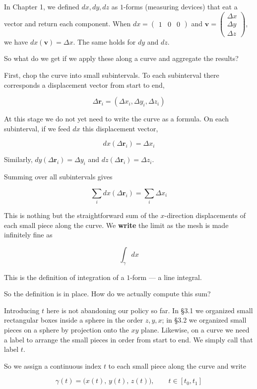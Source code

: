 In Chapter 1, we defined \(dx, dy, dz\) as \(1\)-forms (measuring
devices) that eat a vector and return each component. When
\(dx = \begin{pmatrix}1&0&0\end{pmatrix}\) and
\(\mathbf{v} = \begin{pmatrix}\Delta x\\\Delta y\\\Delta z\end{pmatrix}\),
we have \(dx(\mathbf{v}) = \Delta x\). The same holds for \(dy\) and
\(dz\).

So what do we get if we apply these along a curve and aggregate the
results?

First, chop the curve into small subintervals. To each subinterval there
corresponds a displacement vector from start to end,

\[
\Delta\mathbf{r}_i=(\Delta x_i,\Delta y_i,\Delta z_i)
\]

At this stage we do not yet need to write the curve as a formula. On
each subinterval, if we feed \(dx\) this displacement vector,

\[dx(\Delta\mathbf{r}_i)=\Delta x_i\]

Similarly, \(dy(\Delta\mathbf{r}_i)=\Delta y_i\) and
\(dz(\Delta\mathbf{r}_i)=\Delta z_i\).

Summing over all subintervals gives

\[
\sum_i dx(\Delta\mathbf{r}_i)=\sum_i \Delta x_i
\]

This is nothing but the straightforward sum of the \(x\)-direction
displacements of each small piece along the curve. We \textbf{write} the
limit as the mesh is made infinitely fine as

\[\int_\gamma dx\]

This is the definition of integration of a \(1\)-form --- a line
integral.

So the definition is in place. How do we actually compute this sum?

Introducing \(t\) here is not abandoning our policy so far. In §3.1 we
organized small rectangular boxes inside a sphere in the order
\(z,y,x\); in §3.2 we organized small pieces on a sphere by projection
onto the \(xy\) plane. Likewise, on a curve we need a label to arrange
the small pieces in order from start to end. We simply call that label
\(t\).

So we assign a continuous index \(t\) to each small piece along the
curve and write

\[\gamma(t) = \bigl(x(t),\, y(t),\, z(t)\bigr),\qquad t \in [t_0, t_1]\]

